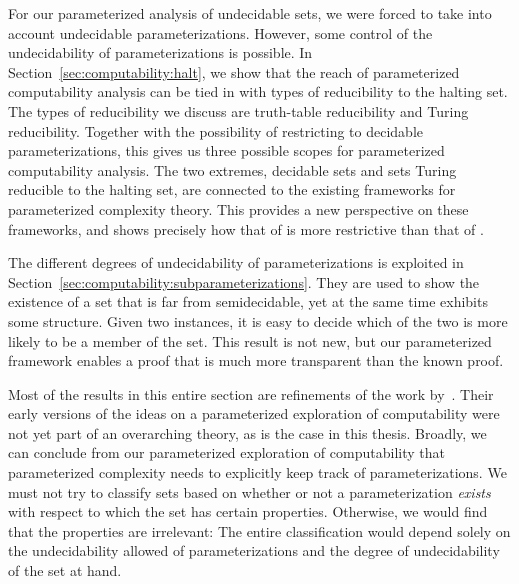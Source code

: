 For our parameterized analysis of undecidable sets, we were forced to take into account undecidable parameterizations.
However, some control of the undecidability of parameterizations is possible.
In Section~\ref{sec:computability:halt}, we show that the reach of parameterized computability analysis can be tied in with types of reducibility to the halting set.
The types of reducibility we discuss are truth-table reducibility and Turing reducibility.
Together with the possibility of restricting to decidable parameterizations, this gives us three possible scopes for parameterized computability analysis.
The two extremes, decidable sets and sets Turing reducible to the halting set, are connected to the existing frameworks for parameterized complexity theory.
This provides a new perspective on these frameworks, and shows precisely how that of \citeauthor{flum2006parameterized} is more restrictive than that of \citeauthor{downey1999parameterized}.

The different degrees of undecidability of parameterizations is exploited in Section~\ref{sec:computability:subparameterizations}.
They are used to show the existence of a set that is far from semidecidable, yet at the same time exhibits some structure.
Given two instances, it is easy to decide which of the two is more likely to be a member of the set.
This result is not new, but our parameterized framework enables a proof that is much more transparent than the known proof.

Most of the results in this entire section are refinements of the work by~\textcite{witteveen2016fixed}.
Their early versions of the ideas on a parameterized exploration of computability were not yet part of an overarching theory, as is the case in this thesis.
Broadly, we can conclude from our parameterized exploration of computability that parameterized complexity needs to explicitly keep track of parameterizations.
We must not try to classify sets based on whether or not a parameterization \emph{exists} with respect to which the set has certain properties.
Otherwise, we would find that the properties are irrelevant:
The entire classification would depend solely on the undecidability allowed of parameterizations and the degree of undecidability of the set at hand.


